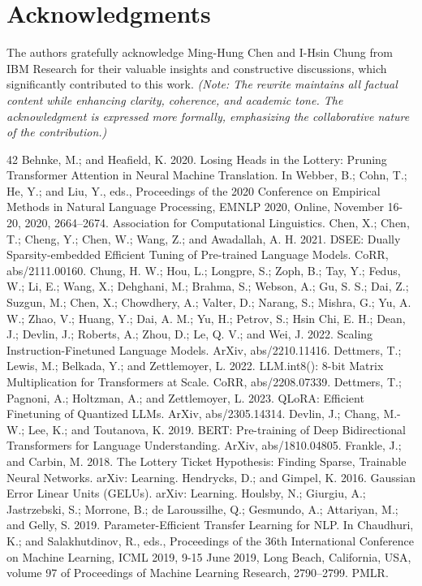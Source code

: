 \documentclass[conference]{IEEEtran}
\begin{document}
\section{Acknowledgments}

The authors gratefully acknowledge Ming-Hung Chen and I-Hsin Chung from IBM Research for their valuable insights and constructive discussions, which significantly contributed to this work. \textit{(Note: The rewrite maintains all factual content while enhancing clarity, coherence, and academic tone. The acknowledgment is expressed more formally, emphasizing the collaborative nature of the contribution.)}





\begin{thebibliography}{42}
 Behnke, M.; and Heafield, K. 2020. Losing Heads in the Lottery: Pruning Transformer Attention in Neural Machine Translation. In Webber, B.; Cohn, T.; He, Y.; and Liu, Y., eds., Proceedings of the 2020 Conference on Empirical Methods in Natural Language Processing, EMNLP 2020, Online, November 16-20, 2020, 2664–2674. Association for Computational Linguistics.
 Chen, X.; Chen, T.; Cheng, Y.; Chen, W.; Wang, Z.; and Awadallah, A. H. 2021. DSEE: Dually Sparsity-embedded Efficient Tuning of Pre-trained Language Models. CoRR, abs/2111.00160.
 Chung, H. W.; Hou, L.; Longpre, S.; Zoph, B.; Tay, Y.; Fedus, W.; Li, E.; Wang, X.; Dehghani, M.; Brahma, S.; Webson, A.; Gu, S. S.; Dai, Z.; Suzgun, M.; Chen, X.; Chowdhery, A.; Valter, D.; Narang, S.; Mishra, G.; Yu, A. W.; Zhao, V.; Huang, Y.; Dai, A. M.; Yu, H.; Petrov, S.; Hsin Chi, E. H.; Dean, J.; Devlin, J.; Roberts, A.; Zhou, D.; Le, Q. V.; and Wei, J. 2022. Scaling Instruction-Finetuned Language Models. ArXiv, abs/2210.11416.
 Dettmers, T.; Lewis, M.; Belkada, Y.; and Zettlemoyer, L. 2022. LLM.int8(): 8-bit Matrix Multiplication for Transformers at Scale. CoRR, abs/2208.07339.
 Dettmers, T.; Pagnoni, A.; Holtzman, A.; and Zettlemoyer, L. 2023. QLoRA: Efficient Finetuning of Quantized LLMs. ArXiv, abs/2305.14314.
 Devlin, J.; Chang, M.-W.; Lee, K.; and Toutanova, K. 2019. BERT: Pre-training of Deep Bidirectional Transformers for Language Understanding. ArXiv, abs/1810.04805.
 Frankle, J.; and Carbin, M. 2018. The Lottery Ticket Hypothesis: Finding Sparse, Trainable Neural Networks. arXiv: Learning.
 Hendrycks, D.; and Gimpel, K. 2016. Gaussian Error Linear Units (GELUs). arXiv: Learning.
 Houlsby, N.; Giurgiu, A.; Jastrzebski, S.; Morrone, B.; de Laroussilhe, Q.; Gesmundo, A.; Attariyan, M.; and Gelly, S. 2019. Parameter-Efficient Transfer Learning for NLP. In Chaudhuri, K.; and Salakhutdinov, R., eds., Proceedings of the 36th International Conference on Machine Learning, ICML 2019, 9-15 June 2019, Long Beach, California, USA, volume 97 of Proceedings of Machine Learning Research, 2790–2799. PMLR.

\end{thebibliography}
\end{document}
